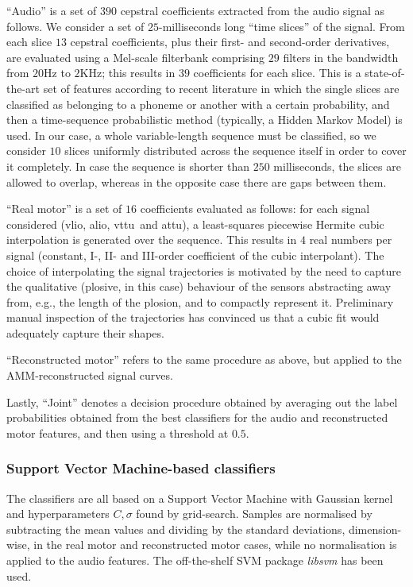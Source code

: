 \documentclass[10pt]{article}
\newcommand{\vlio}{\textsf{vlio}}
\newcommand{\vttu}{\textsf{vttu}}
\newcommand{\alio}{\textsf{alio}}
\newcommand{\attu}{\textsf{attu}}
\begin{document}
``Audio'' is a set of $390$ cepstral coefficients extracted from the audio signal
as follows. We consider a set of $25$-milliseconds long ``time slices'' of the signal.
From each slice $13$ cepstral coefficients, plus their first- and second-order derivatives,
are evaluated using a Mel-scale filterbank comprising $29$ filters in the bandwidth from
$20$Hz to $2$KHz; this results in $39$ coefficients for each slice. This is a state-of-the-art
set of features according to recent literature \cite{bourl,pinto:icassp-phnrecog:2008}
in which the single slices are classified as belonging to a phoneme or another with a certain
probability, and then a time-sequence probabilistic method (typically, a Hidden Markov Model)
is used. In our case, a whole variable-length sequence must be classified, so we consider
$10$ slices uniformly distributed across the sequence itself in order to cover it completely.
In case the sequence is shorter than $250$ milliseconds, the slices are allowed to overlap,
whereas in the opposite case there are gaps between them.

``Real motor'' is a set of $16$ coefficients evaluated as follows: for each
signal considered (\vlio, \alio, \vttu\ and \attu), a least-squares piecewise
Hermite cubic interpolation is generated over the sequence. This results in $4$ real
numbers per signal (constant, I-, II- and III-order coefficient of the cubic
interpolant). The choice of interpolating the signal trajectories is motivated by
the need to capture the qualitative (plosive, in this case) behaviour of the sensors
abstracting away from, e.g., the length of the plosion, and to compactly represent it.
Preliminary manual inspection of the trajectories has convinced us that a cubic fit
would adequately capture their shapes.

``Reconstructed motor'' refers to the same procedure as above, but applied
to the AMM-reconstructed signal curves.

Lastly, ``Joint'' denotes a decision procedure obtained by averaging out the
label probabilities obtained from the best classifiers for the audio and
reconstructed motor features, and then using a threshold at $0.5$.

\subsubsection*{Support Vector Machine-based  classifiers}
The classifiers are all based on a Support Vector Machine \cite{BGV92} with Gaussian kernel
and hyperparameters $C, \sigma$ found by grid-search. Samples are normalised
by subtracting the mean values and dividing by the standard deviations,
dimension-wise, in the real motor and reconstructed motor cases, while
no normalisation is applied to the audio features. The off-the-shelf SVM
package \emph{libsvm} \cite{libsvm} has been used.
\end{document}

